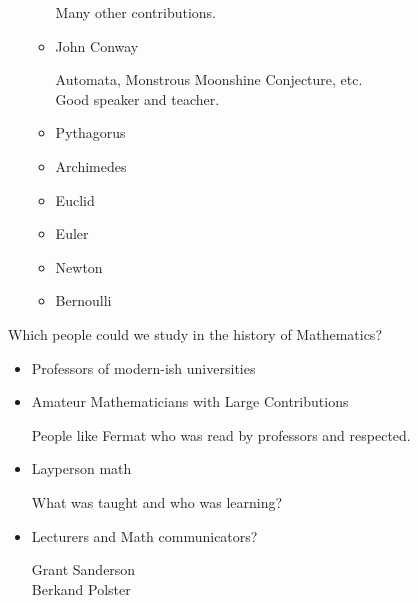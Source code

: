 \documentclass{report}
\begin{document}
\begin{description}
\begin{itemize}
\begin{mdframed}
\begin{itemize}
\begin{mdframed}
                               Many other contributions.
                           \end{mdframed}
                       \item John Conway
                           \begin{mdframed}
                               Automata, Monstrous Moonshine Conjecture,
                               etc.\\
                               Good speaker and teacher.
                           \end{mdframed}
                       \item Pythagorus
                       \item Archimedes
                       \item Euclid
                       \item Euler
                       \item Newton
                       \item Bernoulli
                   \end{itemize}
                \end{mdframed}
        \end{itemize}
    \pagebreak
    \item 
        Which people could we study in the history of
        Mathematics?
        \begin{mdframed}
            \begin{itemize}
                \item Professors of modern-ish universities 
                \item Amateur Mathematicians with Large Contributions
                    \begin{mdframed}
                        People like Fermat who was read by
                        professors and respected.
                    \end{mdframed}
                \item Layperson math
                    \begin{mdframed}
                        What was taught and who
                        was learning?
                    \end{mdframed}
                \item Lecturers and Math communicators?
                    \begin{mdframed}
                        Grant Sanderson\\
                        Berkand Polster

\end{mdframed}
\end{itemize}
\end{mdframed}
\end{description}
\end{document}
